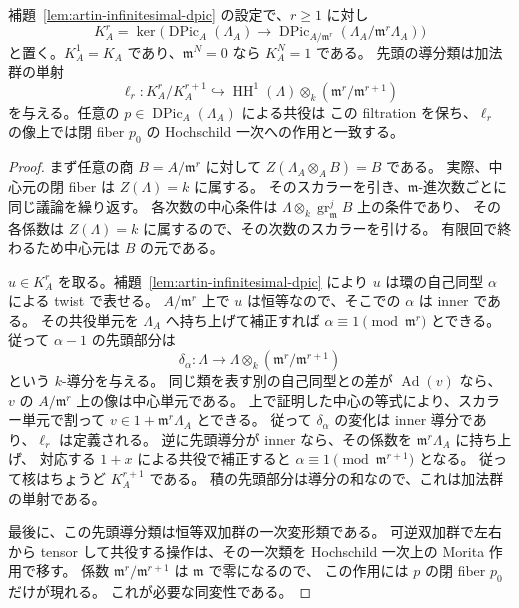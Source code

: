 \begin{lemma}
\label{lem:artin-dpic-associated-graded}
補題~\ref{lem:artin-infinitesimal-dpic} の設定で、$r\geq1$ に対し
\[
 K_A^r=\ker\bigl(\operatorname{DPic}_A(\Lambda_A)
       \longrightarrow
       \operatorname{DPic}_{A/\mathfrak m^r}
                    (\Lambda_A/\mathfrak m^r\Lambda_A)\bigr)
\]
と置く。$K_A^1=K_A$ であり、$\mathfrak m^N=0$ なら $K_A^N=1$ である。
先頭の導分類は加法群の単射
\[
 \ell_r:K_A^r/K_A^{r+1}\hookrightarrow
 \operatorname{HH}^1(\Lambda)\otimes_k
                  (\mathfrak m^r/\mathfrak m^{r+1})
\]
を与える。任意の $p\in\operatorname{DPic}_A(\Lambda_A)$ による共役は
この filtration を保ち、$\ell_r$ の像上では閉 fiber $p_0$ の
Hochschild 一次への作用と一致する。
\end{lemma}
\begin{proof}
まず任意の商 $B=A/\mathfrak m^r$ に対して
$Z(\Lambda_A\otimes_AB)=B$ である。
実際、中心元の閉 fiber は $Z(\Lambda)=k$ に属する。
そのスカラーを引き、$\mathfrak m$-進次数ごとに同じ議論を繰り返す。
各次数の中心条件は
$\Lambda\otimes_k\operatorname{gr}_{\mathfrak m}^jB$ 上の条件であり、
その各係数は $Z(\Lambda)=k$ に属するので、その次数のスカラーを引ける。
有限回で終わるため中心元は $B$ の元である。

$u\in K_A^r$ を取る。補題~\ref{lem:artin-infinitesimal-dpic} により
$u$ は環の自己同型 $\alpha$ による twist で表せる。
$A/\mathfrak m^r$ 上で $u$ は恒等なので、そこでの $\alpha$ は inner である。
その共役単元を $\Lambda_A$ へ持ち上げて補正すれば
$\alpha\equiv1\pmod{\mathfrak m^r}$ とできる。
従って $\alpha-1$ の先頭部分は
\[
 \delta_\alpha:\Lambda\longrightarrow
       \Lambda\otimes_k(\mathfrak m^r/\mathfrak m^{r+1})
\]
という $k$-導分を与える。
同じ類を表す別の自己同型との差が $\operatorname{Ad}(v)$ なら、
$v$ の $A/\mathfrak m^r$ 上の像は中心単元である。
上で証明した中心の等式により、スカラー単元で割って
$v\in1+\mathfrak m^r\Lambda_A$ とできる。
従って $\delta_\alpha$ の変化は inner 導分であり、$\ell_r$ は定義される。
逆に先頭導分が inner なら、その係数を $\mathfrak m^r\Lambda_A$ に持ち上げ、
対応する $1+x$ による共役で補正すると
$\alpha\equiv1\pmod{\mathfrak m^{r+1}}$ となる。
従って核はちょうど $K_A^{r+1}$ である。
積の先頭部分は導分の和なので、これは加法群の単射である。

最後に、この先頭導分類は恒等双加群の一次変形類である。
可逆双加群で左右から tensor して共役する操作は、その一次類を
Hochschild 一次上の Morita 作用で移す。
係数 $\mathfrak m^r/\mathfrak m^{r+1}$ は $\mathfrak m$ で零になるので、
この作用には $p$ の閉 fiber $p_0$ だけが現れる。
これが必要な同変性である。
\end{proof}

